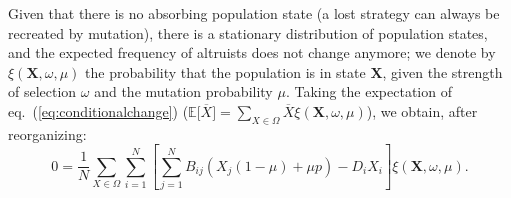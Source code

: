 \documentclass[11pt, letterpaper]{article}
\renewcommand{\eqref}[1]{\textup{{\normalfont eq.~(\ref{#1}}\normalfont)}}
\newcommand{\Esp}[1]{\mathbb{E}\big[ #1\big]}%
\begin{document}
Given that there is no absorbing population state (a lost strategy can always be recreated by mutation), there is a stationary distribution of population states, and the expected frequency of altruists does not change anymore; we denote by $\xi(\mathbf{X}, \omega, \mu)$ the probability that the population is in state $\mathbf{X}$, given the strength of selection $\omega$ and the mutation probability $\mu$. Taking the expectation of \eqref{eq:conditionalchange} ($\Esp{\overline{X}} = \sum_{X \in \Omega} \overline{X}\xi(\mathbf{X}, \omega, \mu)$), we obtain, after reorganizing:
\begin{equation}\label{eq:statdist}
0 = \frac{1}{N} \sum_{X\in \Omega} \sum_{i=1}^N \left[ \sum_{j=1}^N B_{ij} \left( X_j (1-\mu) + \mu p \right) -D_i X_i \right] \xi(\mathbf{X}, \omega, \mu). 
\end{equation}
\end{document}
